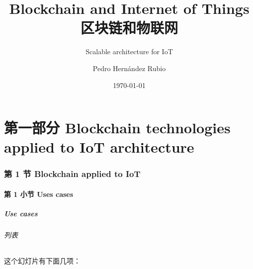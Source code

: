 \documentclass[
    aspectratio=169,                   %
]{beamer}
\begin{document}
    \title{Blockchain and Internet of Things 区块链和物联网}  %
    \subtitle{Scalable architecture for IoT}         %
    \author{Pedro Hernández Rubio}                  %
    \date{\today}                          %
    \maketitle                             %

\part{第一部分 Blockchain technologies applied to IoT architecture}

\AtBeginSection[]{
    \begin{frame}
        \sectionpage                   %
    \end{frame}
}


\section{第 1 节 Blockchain applied to IoT}

\subsection{第 1 小节 Uses cases}

    \begin{frame}
        \frametitle{Use cases}

        \paragraph{列表} 这个\alert{幻灯片}有下面几项：

    \end{frame}
\end{document}

